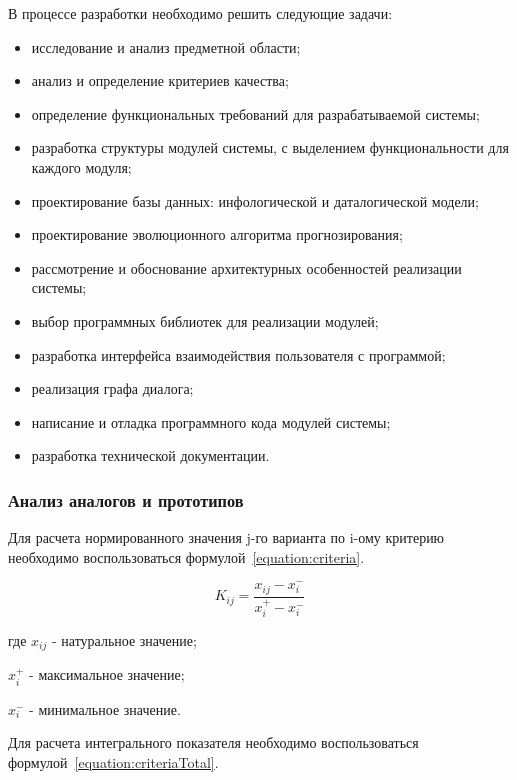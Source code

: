 В процессе разработки необходимо решить следующие задачи:
\begin{itemize}
\item исследование и анализ предметной области;
\item анализ и определение критериев качества;
\item определение функциональных требований для разрабатываемой системы;
\item разработка структуры модулей системы, с выделением функциональности для каждого модуля;
\item проектирование базы данных: инфологической и даталогической модели;
\item проектирование эволюционного алгоритма прогнозирования;
\item рассмотрение и обоснование архитектурных особенностей реализации системы;
\item выбор программных библиотек для реализации модулей;
\item разработка интерфейса взаимодействия пользователя с программой;
\item реализация графа диалога;
\item написание и отладка программного кода модулей системы;
\item разработка технической документации.
\end{itemize}

\clearpage
\subsubsection{Анализ аналогов и прототипов}

Для расчета нормированного значения j-го варианта по i-ому критерию необходимо
воспользоваться формулой~\ref{equation:criteria}.

\begin{equation}
\label{equation:criteria}
K_{ij} = \frac{x_{ij} - x_i^-}{x_i^+ - x_i^-}
\end{equation}
\begin{ESKDexplanation}
\item[где ] $x_{ij}$ - натуральное значение;
\item       $x_i^+$ - максимальное значение;
\item       $x_i^-$ - минимальное значение.
\end{ESKDexplanation}

Для расчета интегрального показателя необходимо воспользоваться формулой~\ref{equation:criteriaTotal}.


